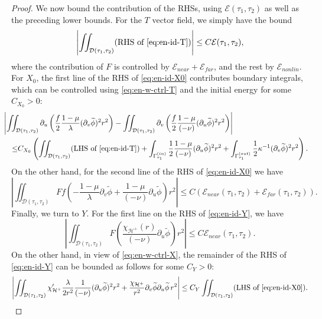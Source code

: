 \documentclass[10pt, reqno]{amsart}
\theoremstyle{definition}
\theoremstyle{remark}
\theoremstyle{conjecture}
\numberwithin{equation}{section}
\newcommand{\rd}{\partial}
\newcommand{\0}{\emptyset}
\newcommand{\Gmm}{\Gamma}
\newcommand{\kpp}{\kappa}
\newcommand{\lmb}{\lambda}
\newcommand{\calD}{\mathcal D}
\newcommand{\calE}{\mathcal E}
\newcommand{\calH}{\mathcal H}
\newcommand{\dur}{\nu}
\newcommand{\dvr}{\lmb}
\newcommand{\EH}{\calH^{+}}
\newcommand{\phibg}{\overline{\phi}}				%
\newcommand{\phidf}{\widetilde{\phi}}				%
\newcommand{\Abs}[1]{\left\vert #1 \right\vert}
\begin{document}
\begin{proof}
We now bound the contribution of the RHSs, using $\calE(\tau_{1}, \tau_{2})$ as well as the preceding lower bounds. For the $T$ vector field, we simply have the bound
\begin{equation} \label{eq:en-w-ctrl-T1}
	\Abs{\iint_{\calD(\tau_{1}, \tau_{2})} (\hbox{RHS of \eqref{eq:en-id-T}})}
	\leq C \calE(\tau_{1}, \tau_{2}),
\end{equation}
where the contribution of $F$ is controlled by $\calE_{near} + \calE_{far}$, and the rest by $\calE_{nonlin}$. For $X_{0}$, the first line of the RHS of \eqref{eq:en-id-X0} contributes boundary integrals, which can be controlled using \eqref{eq:en-w-ctrl-T} and the initial energy for some $C_{X_0}>0$:
\begin{equation} \label{eq:en-w-ctrl-X1}
\begin{aligned}
& \hskip-2em
	\Abs{\iint_{\calD(\tau_{1}, \tau_{2})} \rd_{u} \left( \frac{f}{2} \frac{1-\mu}{\dvr} (\rd_{v} \phidf)^{2} r^{2} \right) 
		- \iint_{\calD(\tau_{1}, \tau_{2})} \rd_{v} \left( \frac{f}{2} \frac{1-\mu}{(-\dur)} (\rd_{u} \phidf)^{2} r^{2} \right) } \\
	\leq & C_{X_{0}} \left(\iint_{\calD(\tau_{1}, \tau_{2})} (\hbox{LHS of \eqref{eq:en-id-T}})
	+\int_{\Gmm^{(in)}_{\tau_{1}}} \frac{1}{2} \frac{1-\mu}{(-\dur)} (\rd_{u} \phidf)^{2} r^{2} 
	+\int_{\Gmm^{(out)}_{\tau_{1}}} \frac{1}{2} \kpp^{-1} (\rd_{v} \phidf)^{2} r^{2} \right).
\end{aligned}\end{equation}
On the other hand, for the second line of the RHS of \eqref{eq:en-id-X0} we have
\begin{equation} \label{eq:en-w-ctrl-X2}
	\Abs{\iint_{\calD(\tau_{1}, \tau_{2})} F f \left( - \frac{1-\mu}{\dvr} \rd_{v} \phidf + \frac{1-\mu}{(-\dur)} \rd_{u} \phidf \right) r^{2} }
	\leq C ( \calE_{near}(\tau_{1}, \tau_{2}) + \calE_{far}(\tau_{1}, \tau_{2})).
\end{equation}
Finally, we turn to $Y$. For the first line on the RHS of \eqref{eq:en-id-Y}, we have
\begin{equation} \label{eq:en-w-ctrl-Y1}
	\Abs{\iint_{\calD(\tau_{1}, \tau_{2})}  F \left( \frac{\chi_{\EH}(r)}{(-\dur)} \rd_{u} \phidf \right) r^{2} }
	\leq C \calE_{near}(\tau_{1}, \tau_{2}) .
\end{equation}
On the other hand, in view of \eqref{eq:en-w-ctrl-X}, the remainder of the RHS of \eqref{eq:en-id-Y} can be bounded as follows for some $C_Y>0$:
\begin{equation} \label{eq:en-w-ctrl-Y2}
	\Abs{\iint_{\calD(\tau_{1}, \tau_{2})} 
	\chi'_{\EH} \frac{\dvr}{2 r^{2}} \frac{1}{(-\dur)} (\rd_{u} \phidf)^{2} r^{2}
	+ \frac{\chi_{\EH}}{r^{2}} \rd_{v} \phidf \rd_{u} \phidf \, r^{2} } 
	\leq C_{Y} \iint_{\calD(\tau_{1}, \tau_{2})} (\hbox{LHS of \eqref{eq:en-id-X0}}).
\end{equation}


\end{proof}
\end{document}
